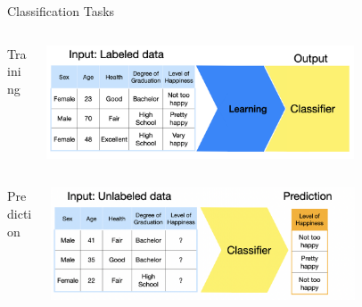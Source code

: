 \documentclass[11pt,compress,t,notes=noshow, xcolor=table]{beamer}
\begin{document}
\begin{vbframe}{Classification Tasks}
\begin{columns}  
\begin{column}{0.1\textwidth} 
\begin{center}
Training
\end{center}
\end{column}
\begin{column}{0.9\textwidth} 
\begin{center}
  \includegraphics[width = 0.75\textwidth]{figure_man/nutshell-classification-training-task.png}
\end{center}
\end{column}
\end{columns}
\begin{columns}
\begin{column}{0.1\textwidth} 
\begin{center}
Prediction
\end{center}
\end{column}
\begin{column}{0.9\textwidth} 
\begin{center}
  \includegraphics[width = 0.75\textwidth]{figure_man/nutshell-classification-prediction-task.png} 
\end{center}
\end{column}
\end{columns}
\end{vbframe}
\end{document}
